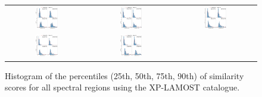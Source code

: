\documentclass{aa}
\begin{document}
\begin{appendix}
\begin{figure}[htbp]
    \centering
    \begin{tabular}{ccc}
        \includegraphics[width=0.29\textwidth]{Plots/simil_thresh_hists/simil_thresh_histograms_R2_zhang.pdf} & \includegraphics[width=0.29\textwidth]{Plots/simil_thresh_hists/simil_thresh_histograms_R3_zhang.pdf} & \includegraphics[width=0.29\textwidth]{Plots/simil_thresh_hists/simil_thresh_histograms_R4_zhang.pdf}  \\ \includegraphics[width=0.29\textwidth]{Plots/simil_thresh_hists/simil_thresh_histograms_R5_zhang.pdf} &     \includegraphics[width=0.29\textwidth]{Plots/simil_thresh_hists/simil_thresh_histograms_R6_zhang.pdf}
        \\
    \end{tabular}
    \caption{Histogram of the percentiles (25th, 50th, 75th, 90th) of similarity scores for all spectral regions using the XP-LAMOST catalogue.}
\end{figure}

\end{appendix}
\end{document}
